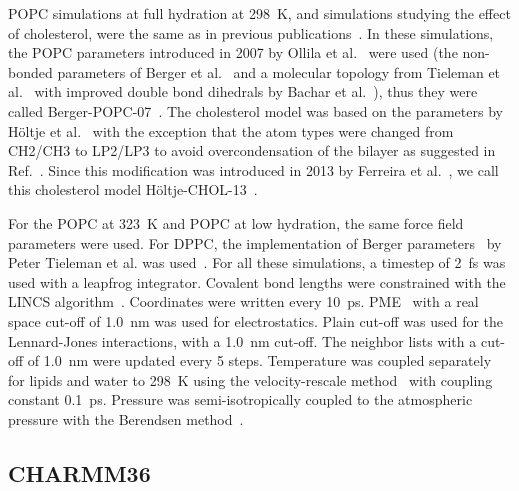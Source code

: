 \documentclass[journal=jacsat,manuscript=article]{achemso}
\begin{document}
POPC simulations at full hydration at 298~K, and simulations studying the effect of cholesterol, were the same as in previous publications~\cite{ferreira13,ferreira15}.
In these simulations, the POPC parameters introduced in 2007 by Ollila et al.~\cite{ollila07a} were used (the non-bonded parameters of Berger et al.~\cite{berger97}
and a molecular topology from Tieleman et al.~\cite{tieleman99} with improved double bond dihedrals by Bachar et al.~\cite{bachar04}), thus
they were called Berger-POPC-07~\cite{ollila07a}. The cholesterol model was based on the parameters by H\"oltje et al.~\cite{holtje01} with the
exception that the atom types were changed from CH2/CH3 to LP2/LP3 to avoid overcondensation of the bilayer as suggested in Ref.~.
Since this modification was introduced in 2013 by Ferreira et al.~\cite{ferreira13}, we call this cholesterol model H\"oltje-CHOL-13~\cite{ferreira13}.

For the POPC at 323~K and POPC at low hydration, the same force field parameters were used.
For DPPC, the implementation of Berger parameters~\cite{berger97} by Peter Tieleman et al. was used~\cite{marrink98}.
For all  these simulations, a timestep of 2~fs was used with a leapfrog integrator. Covalent bond lengths were constrained with the LINCS algorithm~\cite{hess97,hess07}. 
Coordinates were written every 10~ps. PME~\cite{darden93,essman95} with a real space cut-off of 1.0~nm was used 
for electrostatics. Plain cut-off was used for the Lennard-Jones interactions, with a 1.0~nm cut-off.
The neighbor lists with a cut-off of 1.0~nm were updated every 5 steps. Temperature was coupled separately
for lipids and water to 298~K using the velocity-rescale method~\cite{bussi07} with coupling constant 0.1~ps.
Pressure was semi-isotropically coupled to the atmospheric pressure with the Berendsen method~\cite{berendsen84}.

\subsection{CHARMM36}
\end{document}
